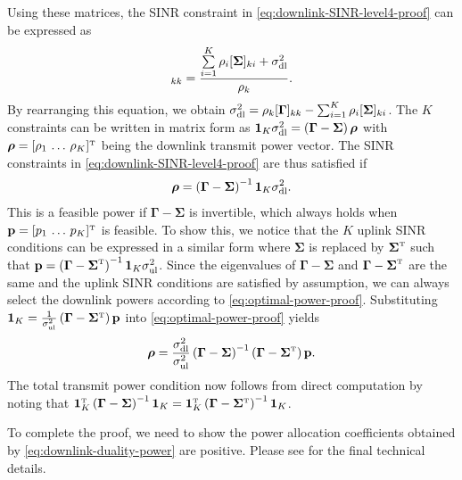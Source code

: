 \documentclass[SIG,biber]{nowfnt}
\newcommand{\vect}[1]{\mathbf{#1}}
\def\Ttran{\mbox{\tiny $\mathrm{T}$}}
\begin{document}
	Using these matrices, the SINR constraint in \eqref{eq:downlink-SINR-level4-proof} can be expressed as
	\begin{align}
[\vect{\Gamma}]_{kk} = \frac{ \sum\limits_{i=1}^{K}\rho_i [\vect{\Sigma}]_{ki} + \sigma_{\rm dl}^2 }{\rho_k}.
	\end{align}
	By rearranging this equation, we obtain
$\sigma_{\rm dl}^2 = \rho_k [\boldsymbol{\Gamma}]_{kk} - \sum\nolimits_{i=1}^{K}\rho_i [\boldsymbol{\Sigma}]_{ki}$.
	The $K$ constraints can be written in matrix form as $
	{\bf 1}_K\sigma_{\rm dl}^2 = \left(\boldsymbol{\Gamma} - \boldsymbol{\Sigma}\right)\boldsymbol{\rho}$ 
	with $\boldsymbol{\rho} =[\rho_1 \, \ldots \, \rho_K]^{\Ttran}$ being the downlink transmit power vector. The SINR constraints in \eqref{eq:downlink-SINR-level4-proof} are thus satisfied if 
	\begin{align}\label{eq:optimal-power-proof}
	\boldsymbol{\rho} = \left(\boldsymbol{\Gamma} - \boldsymbol{\Sigma}\right)^{-1}{\bf 1}_K\sigma_{\rm dl}^2.
	\end{align}
	This is a feasible power if $\boldsymbol{\Gamma} - \boldsymbol{\Sigma}$ is invertible, which always holds when ${\bf p}=[p_1 \, \ldots \, p_K]^{\Ttran}$ is feasible. To show this, we notice that the $K$ uplink SINR conditions can be expressed in a similar form where $\boldsymbol{\Sigma}$ is replaced by $\boldsymbol{\Sigma}^{\Ttran}$
	such that ${\bf p} = \left(\boldsymbol{\Gamma} - \boldsymbol{\Sigma}^{\Ttran}\right)^{-1}{\bf 1}_K\sigma_{\rm ul}^2$.
	Since the eigenvalues of $\boldsymbol{\Gamma} - \boldsymbol{\Sigma}$ and $\boldsymbol{\Gamma} - \boldsymbol{\Sigma}^{\Ttran}$ are the same and the uplink SINR conditions are satisfied by assumption, we can always select the downlink powers according to \eqref{eq:optimal-power-proof}. Substituting ${\bf 1}_K = \frac{1}{\sigma_{\rm ul}^2}\left(\vect{\Gamma} - \vect{\Sigma}^{\Ttran}\right){\bf p}$ into \eqref{eq:optimal-power-proof} yields 
	\begin{align}
	\boldsymbol{\rho} = \frac{\sigma_{\rm dl}^2}{\sigma_{\rm ul}^2}\left(\boldsymbol{\Gamma} - \boldsymbol{\Sigma}\right)^{-1}\left(\boldsymbol{\Gamma} - \boldsymbol{\Sigma}^{\Ttran}\right){\bf p}. \label{eq:downlink-duality-power}
	\end{align}
	The total transmit power condition now follows from direct computation by noting that ${\bf 1}_K^{\Ttran}\left(\vect{\Gamma} - \vect{\Sigma}\right)^{-1}{\bf 1}_K={\bf 1}_K^{\Ttran}\left(\vect{\Gamma} - \vect{\Sigma}^{\Ttran}\right)^{-1}{\bf 1}_K$.
	
To complete the proof, we need to show the power allocation coefficients obtained by \eqref{eq:downlink-duality-power} are positive. Please see \cite[Proof of Theorem~4.8]{massivemimobook} for the final technical details.
	
	
	

\backmatter  

\printbibliography
\end{document}
